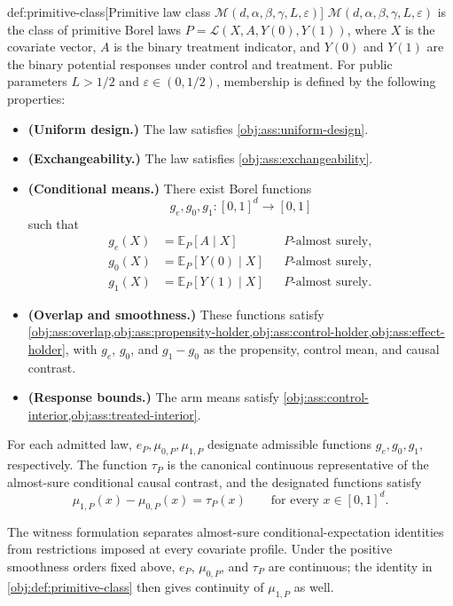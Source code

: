 \begin{definitionv}{def:primitive-class}[Primitive law class \(\mathcal M(d,\alpha,\beta,\gamma,L,\varepsilon)\)]
\(\mathcal M(d,\alpha,\beta,\gamma,L,\varepsilon)\) is the class of primitive Borel laws \(P=\mathcal L(X,A,Y(0),Y(1))\), where \(X\) is the covariate vector, \(A\) is the binary treatment indicator, and \(Y(0)\) and \(Y(1)\) are the binary potential responses under control and treatment. For public parameters \(L>1/2\) and \(\varepsilon\in(0,1/2)\), membership is defined by the following properties:
\begin{itemize}
\item \textbf{(Uniform design.)} The law satisfies \cref{obj:ass:uniform-design}.
\item \textbf{(Exchangeability.)} The law satisfies \cref{obj:ass:exchangeability}.
\item \textbf{(Conditional means.)} There exist Borel functions
\[
g_e,g_0,g_1:[0,1]^d\to[0,1]
\]
such that
\[
\begin{aligned}
g_e(X)&=\mathbb E_P[A\mid X] &&P\text{-almost surely},\\
g_0(X)&=\mathbb E_P[Y(0)\mid X] &&P\text{-almost surely},\\
g_1(X)&=\mathbb E_P[Y(1)\mid X] &&P\text{-almost surely}.
\end{aligned}
\]
\item \textbf{(Overlap and smoothness.)} These functions satisfy \cref{obj:ass:overlap,obj:ass:propensity-holder,obj:ass:control-holder,obj:ass:effect-holder}, with \(g_e\), \(g_0\), and \(g_1-g_0\) as the propensity, control mean, and causal contrast.
\item \textbf{(Response bounds.)} The arm means satisfy \cref{obj:ass:control-interior,obj:ass:treated-interior}.
\end{itemize}
For each admitted law, \(e_P,\mu_{0,P},\mu_{1,P}\) designate admissible functions \(g_e,g_0,g_1\), respectively. The function \(\tau_P\) is the canonical continuous representative of the almost-sure conditional causal contrast, and the designated functions satisfy
\[
\mu_{1,P}(x)-\mu_{0,P}(x)=\tau_P(x)
\qquad\text{for every }x\in[0,1]^d.
\]
\end{definitionv}

The witness formulation separates almost-sure conditional-expectation identities from restrictions imposed at every covariate profile. Under the positive smoothness orders fixed above, \(e_P\), \(\mu_{0,P}\), and \(\tau_P\) are continuous; the identity in \cref{obj:def:primitive-class} then gives continuity of \(\mu_{1,P}\) as well.

